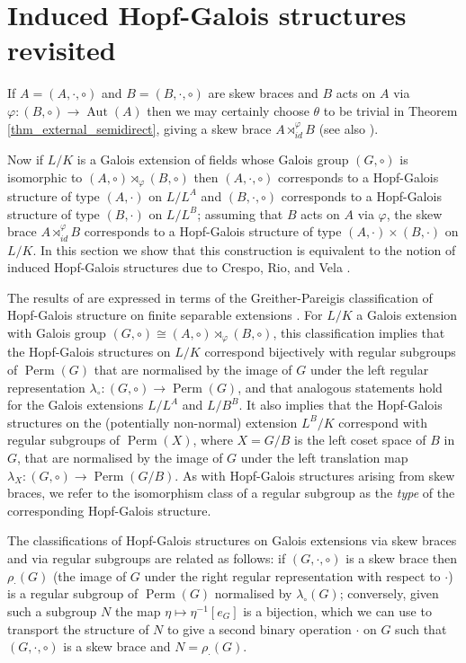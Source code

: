 \documentclass[12pt,a4paper, reqno]{amsart}
\theoremstyle{definition}
\DeclareMathOperator{\Perm}{\mbox{Perm}}
\DeclareMathOperator{\Aut}{\mbox{Aut}}
\begin{document}
\section{Induced Hopf-Galois structures revisited} \label{sec_induced_HGS}

If $ A=(A,\cdot,\circ) $ and $ B=(B,\cdot,\circ) $ are skew braces and $ B $ acts on $ A $ via $ \varphi : (B,\circ) \rightarrow \Aut(A) $ then we may certainly choose $ \theta $ to be trivial in Theorem \ref{thm_external_semidirect}, giving a skew brace $ A \rtimes_{id}^{\varphi} B $ (see also \cite[Corollary 2.37]{SV18}). 

Now if $ L/K $ is a Galois extension of fields whose Galois group $ (G,\circ) $ is isomorphic to $ (A,\circ) \rtimes_{\varphi} (B,\circ) $ then $ (A,\cdot,\circ) $ corresponds to a Hopf-Galois structure of type $ (A,\cdot) $ on $ L/L^{A} $ and $ (B,\cdot,\circ) $ corresponds to a Hopf-Galois structure of type $ (B,\cdot) $ on $ L/L^{B} $; assuming that $ B $ acts on $ A $ via $ \varphi $, the skew brace $ A \rtimes_{id}^{\varphi} B $ corresponds to a Hopf-Galois structure of type $ (A,\cdot) \times (B,\cdot) $ on $ L/K $. In this section we show that this construction is equivalent to the notion of induced Hopf-Galois structures due to Crespo, Rio, and Vela \cite{CRV16a}. 

The results of \cite{CRV16a} are expressed in terms of the Greither-Pareigis classification of Hopf-Galois structure on finite separable extensions \cite{GP87}. For $ L/K $ a Galois extension with Galois group $ (G,\circ) \cong (A,\circ) \rtimes_{\varphi} (B,\circ) $, this classification implies that the Hopf-Galois structures on $ L/K $ correspond bijectively with regular subgroups of $ \Perm(G) $ that are normalised by the image of $ G $ under the left regular representation $ \lambda_{\circ}: (G,\circ) \rightarrow \Perm(G) $, and that analogous statements hold for the Galois extensions $ L/L^{A} $ and $ L/B^{B} $. It also implies that the Hopf-Galois structures on the (potentially non-normal) extension $ L^{B}/K $ correspond with regular subgroups of $ \Perm(X) $, where $ X=G/B $ is the left coset space of $ B $ in $ G $, that are normalised by the image of $ G $ under the left translation map $ \lambda_{X}: (G,\circ) \rightarrow \Perm(G/B) $. As with Hopf-Galois structures arising from skew braces, we refer to the isomorphism class of a regular subgroup as the \textit{type} of the corresponding Hopf-Galois structure.  

The classifications of Hopf-Galois structures on Galois extensions via skew braces and via regular subgroups are related as follows: if $ (G,\cdot,\circ) $ is a skew brace then $ \rho_{\cdot}(G) $ (the image of $ G $ under the right regular representation with respect to $ \cdot $) is a regular subgroup of $ \Perm(G) $ normalised by $ \lambda_{\circ}(G) $; conversely, given such a subgroup $ N $ the map $ \eta \mapsto \eta^{-1}[e_{G}] $ is a bijection, which we can use to transport the structure of $ N $ to give a second binary operation $ \cdot $ on $ G $ such that $ (G,\cdot,\circ) $ is a skew brace and $ N = \rho_{\cdot}(G) $. 
\end{document}

